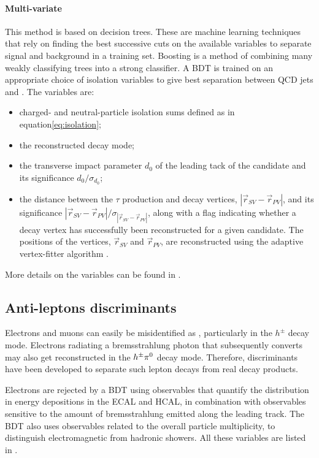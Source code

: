 \paragraph{Multi-variate} This method is based on decision trees. These are machine learning techniques that rely on finding the best successive cuts on the available variables to separate signal and background in a training set. Boosting is a method of combining many weakly classifying trees into a strong classifier. A BDT is trained on an appropriate choice of isolation variables to give best separation between QCD jets and \tauh. The variables are: 
    \begin{itemize}
        \item charged- and neutral-particle isolation sums defined as in equation\ref{eq:isolation};
        \item the reconstructed decay mode;
        \item the transverse impact parameter $d_0$ of the leading tack of the \tauh candidate and its significance $d_0 / \sigma_{d_0}$;
        \item the distance between the $\tau$ production and decay vertices, $|\Vec{r}_{SV} - \Vec{r}_{PV}|$, and its significance $|\Vec{r}_{SV} - \Vec{r}_{PV}|/\sigma_{|\Vec{r}_{SV} - \Vec{r}_{PV}|}$, along with a flag indicating whether a decay vertex has successfully been reconstructed for a given \tauh candidate. The positions of the vertices, $\Vec{r}_{SV}$ and $\Vec{r}_{PV}$, are reconstructed using the adaptive vertex-fitter algorithm \cite{Waltenberger_2007}.
    \end{itemize}
More details on the variables can be found in \cite{tauh_reconstruction}.

\subsection{Anti-leptons discriminants}

Electrons and muons can easily be misidentified as \tauh, particularly in the $h^{\pm}$ decay mode. Electrons radiating a bremsstrahlung photon that subsequently converts may also get reconstructed in the $h^{\pm}\pi^{0}$ decay mode. Therefore, discriminants have been developed to separate such lepton decays from real \tauh decay products.

Electrons are rejected by a BDT using observables that quantify the distribution in energy depositions in the ECAL and HCAL, in combination with observables sensitive to the amount of bremsstrahlung emitted along the leading track. The BDT also uses observables related to the overall particle multiplicity, to distinguish electromagnetic from hadronic showers.
All these variables are listed in \cite{tauh_reconstruction}.
    
